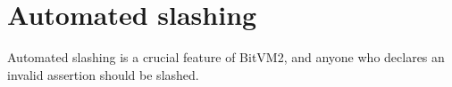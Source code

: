 \section{Automated slashing} \label{sec:automated-slashing}

Automated slashing is a crucial feature of BitVM2, and anyone who declares an invalid assertion should be slashed.
